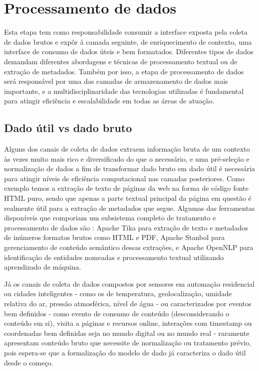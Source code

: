 \chapter{Processamento de dados}

Esta etapa tem como responsabilidade consumir a interface exposta pela coleta de dados brutos e expôr à camada seguinte, de enriquecimento de contexto, uma interface de consumo de dados úteis e bem formatados. Diferentes tipos de dados demandam diferentes abordagens e técnicas de processamento textual ou de extração de metadados. Também por isso, a etapa de processamento de dados será responsável por uma das camadas de armazenamento de dados mais importante, e a multidisciplinaridade das tecnologias utilizadas é fundamental para atingir eficiência e escalabilidade em todas as áreas de atuação.

\section{Dado útil vs dado bruto}

Alguns dos canais de coleta de dados extraem informação bruta de um contexto às vezes muito mais rico e diversificado do que o necessário, e uma pré-seleção e normalização de dados a fim de transformar dado bruto em dado útil é necessária para atingir níveis de eficiência computacional nas camadas posteriores. Como exemplo temos a extração de texto de páginas da web na forma de código fonte HTML puro, sendo que apenas a parte textual principal da página em questão é realmente útil para a extração de metadados que segue. Algumas das ferramentas disponíveis que comporiam um subsistema completo de tratamento e processamento de dados são \cite{ital:jung-andrew}: Apache Tika \cite{apache:tika} para extração de texto e metadados de inúmeros formatos brutos como HTML e PDF, Apache Stanbol \cite{apache:stanbol} para gerenciamento de conteúdo semântico dessas extrações, e Apache OpenNLP \cite{apache:opennlp} para identificação de entidades nomeadas e processamento textual utilizando aprendizado de máquina.

Já os canais de coleta de dados compostos por sensores em automação residencial ou cidades inteligentes - como os de temperatura, geolocalização, umidade relativa do ar, pressão atmosférica, nível de água - ou caracterizados por eventos bem definidos - como evento de consumo de conteúdo (desconsiderando o conteúdo em si), visita a páginas e recursos online, interações com timestamp ou coordenadas bem definidas seja no mundo digital ou no mundo real - raramente apresentam conteúdo bruto que necessite de normalização ou tratamento prévio, pois espera-se que a formalização do modelo de dado já caracteriza o dado útil desde o começo.

